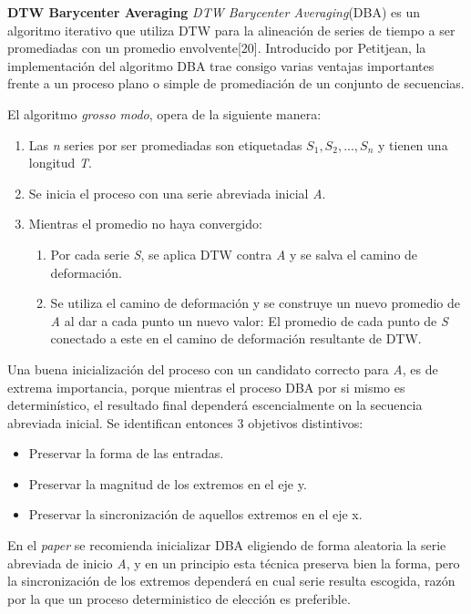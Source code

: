 \begin{multicols}{2}
\hfill\break
\justifying
\textbf{DTW Barycenter Averaging}
	\hfill\break
	\justifying
	\textit{DTW Barycenter Averaging}(DBA) es un algoritmo iterativo que utiliza DTW para la alineación de series de tiempo a ser promediadas con un promedio envolvente[20]. Introducido por Petitjean, la implementación del algoritmo DBA trae consigo varias ventajas importantes frente a un proceso plano o simple de promediación de un conjunto de secuencias.
	
	\hfill\break
	\justifying
	El algoritmo \textit{grosso modo}, opera de la siguiente manera:
	\begin{enumerate}
		\item Las \textit{n} series por ser promediadas son etiquetadas $S_1,S_2,...,S_n$ y tienen una longitud \textit{T}.
		\item Se inicia el proceso con una serie abreviada inicial \textit{A}.
		\item Mientras el promedio no haya convergido:
			\begin{enumerate}
				\item Por cada serie \textit{S}, se aplica DTW contra \textit{A} y se salva el camino de deformación.
				\item Se utiliza el camino de deformación y se construye un nuevo promedio de \textit{A} al dar a cada punto un nuevo valor: El promedio de cada punto de \textit{S} conectado a este en el camino de deformación resultante de DTW.
			\end{enumerate}
	\end{enumerate}

	\hfill\break
	\justifying
	Una buena inicialización del proceso con un candidato correcto para \textit{A}, es de extrema importancia, porque mientras el proceso DBA por si mismo es determinístico, el resultado final dependerá escencialmente on la secuencia abreviada inicial. Se identifican entonces 3 objetivos distintivos:
	\begin{itemize}
		\item Preservar la forma de las entradas.
		\item Preservar la magnitud de los extremos en el eje y.
		\item Preservar la sincronización de aquellos extremos en el eje x.
	\end{itemize}

	\hfill\break
	\justifying
	En el \textit{paper} se recomienda inicializar DBA eligiendo de forma aleatoria la serie abreviada de inicio \textit{A}, y en un principio esta técnica preserva bien la forma, pero la sincronización de los extremos dependerá en cual serie resulta escogida, razón por la que un proceso deterministico de elección es preferible.
	

\end{multicols}
